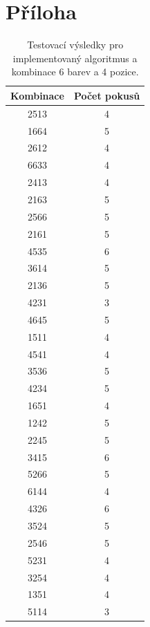 \documentclass[12pt, a4paper]{article}
\begin{document}
\newpage
\section*{Příloha}  

\begin{table}[ht!]
\centering
\begin{tabular}{c | c }

Kombinace &   Počet pokusů\\
\hline
2513 & 4\\
1664 & 5\\
2612 & 4\\
6633 & 4\\
2413 & 4\\
2163 & 5\\
2566 & 5\\
2161 & 5\\
4535 & 6\\
3614 & 5\\
2136 & 5\\
4231 & 3\\
4645 & 5\\
1511 & 4\\
4541 & 4\\
3536 & 5\\
4234 & 5\\
1651 & 4\\
1242 & 5\\
2245 & 5\\
3415 & 6\\
5266 & 5\\
6144 & 4\\
4326 & 6\\
3524 & 5\\
2546 & 5\\
5231 & 4\\
3254 & 4\\
1351 & 4\\
5114 & 3\\
 

\end{tabular}

\caption{Testovací výsledky pro implementovaný algoritmus a kombinace 6 barev a 4 pozice.}
\end{table}
\end{document}
